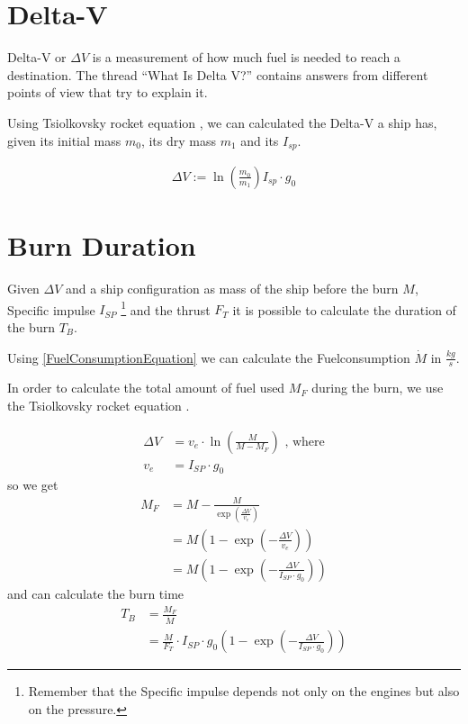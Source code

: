 \documentclass[11pt]{report}
\newcommand{\dv}{{\Delta}{V}}
\begin{document}
\section{Delta-V}

Delta-V or $\dv$  \cite{DeltaV} is a measurement of how
much fuel is needed to reach a destination. The thread ``What Is Delta
V?''  \cite{WhatIsDeltaV} contains answers from different points of
view that try to explain it.

Using Tsiolkovsky rocket equation \cite{TsiolkovskyRocketEquation},
\cite{TsiolkovskyKSP} we can calculated the Delta-V a ship has, given
its initial mass $m_0$, its dry mass $m_1$ and its $I_{sp}$.

\begin{align}
\dv := \ln\left(\frac{m_0}{m_1}\right) I_{sp} \cdot g_0
\end{align}

\section{Burn Duration}

Given $\Delta V$ and a ship configuration as mass of the ship before
the burn $M$, Specific impulse $I_{SP}$ \footnote{Remember that the
  Specific impulse depends not only on the engines but also on the
  pressure.} and the thrust $F_T$ it is possible to
calculate the duration of the burn $T_B$. 

Using \eqref{FuelConsumptionEquation} we can calculate the
Fuelconsumption $\dot{M}$ in $\frac{kg}{s}$.

In order to calculate the total amount of fuel used $M_F$ during the
burn, we use the Tsiolkovsky rocket equation 
\cite{TsiolkovskyRocketEquation}.

\begin{align}
  \Delta V & = v_e \cdot \ln\left(\frac{M}{M-M_F}\right)\textrm{ , where}\nonumber\\
  v_e & = I_{SP}\cdot g_0\nonumber
\end{align}
so we get
\begin{align}
  M_F & = M-\frac{M}{\exp\left(\frac{\Delta V}{v_e}\right)}\nonumber\\
  & = M\left(1-\exp\left(-\frac{\Delta V}{v_e}\right)\right)\nonumber\\
  & = M\left(1-\exp\left(-\frac{\Delta V}{I_{SP}\cdot g_0}\right)\right)
\end{align}
and can calculate the burn time
\begin{align}
  T_B & = \frac{M_F}{\dot{M}}\nonumber\\
  & = \frac{M}{F_T}\cdot I_{SP} \cdot g_0\left(1-\exp\left(-\frac{\Delta V}{I_{SP}\cdot g_0}\right)\right)
\end{align}
\end{document}
